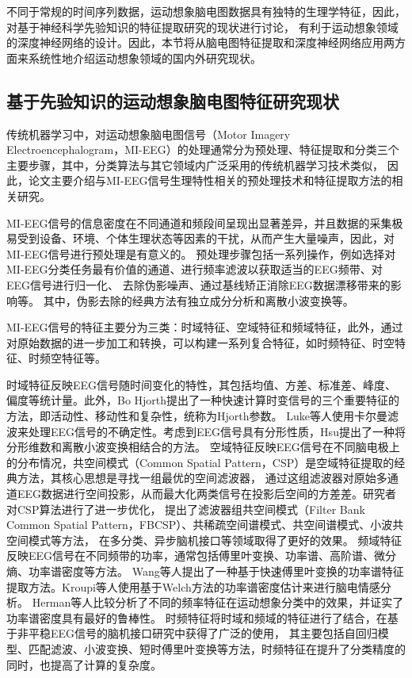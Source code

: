 不同于常规的时间序列数据，运动想象脑电图数据具有独特的生理学特征，因此，对基于神经科学先验知识的特征提取研究的现状进行讨论，
有利于运动想象领域的深度神经网络的设计。因此，本节将从脑电图特征提取和深度神经网络应用两方面来系统性地介绍运动想象领域的国内外研究现状。

\subsection{基于先验知识的运动想象脑电图特征研究现状}

传统机器学习中，对运动想象脑电图信号（Motor Imagery Electroencephalogram，MI-EEG）的处理通常分为预处理、特征提取和分类三个主要步骤\cite{altaheri2023deep}，其中，分类算法与其它领域内广泛采用的传统机器学习技术类似，
因此，论文主要介绍与MI-EEG信号生理特性相关的预处理技术和特征提取方法的相关研究。

MI-EEG信号的信息密度在不同通道和频段间呈现出显著差异，并且数据的采集极易受到设备、环境、个体生理状态等因素的干扰，从而产生大量噪声，因此，对MI-EEG信号进行预处理是有意义的。
预处理步骤包括一系列操作，例如选择对MI-EEG分类任务最有价值的通道、进行频率滤波以获取适当的EEG频带、对EEG信号进行归一化、
去除伪影噪声\cite{altaheri2023deep}、通过基线矫正消除EEG数据漂移带来的影响等。
其中，伪影去除的经典方法有独立成分分析和离散小波变换等\cite{sai2017automated}。

MI-EEG信号的特征主要分为三类：时域特征、空域特征和频域特征\cite{altaheri2023deep}，此外，通过对原始数据的进一步加工和转换，可以构建一系列复合特征，如时频特征、时空特征、时频空特征等。

时域特征反映EEG信号随时间变化的特性，其包括均值、方差、标准差、峰度、偏度等统计量。此外，Bo Hjorth\cite{HJORTH1970306}提出了一种快速计算时变信号的三个重要特征的方法，即活动性、移动性和复杂性，统称为Hjorth参数。
Luke等人\cite{7448410}使用卡尔曼滤波来处理EEG信号的不确定性。考虑到EEG信号具有分形性质，Hsu\cite{HSU2010295}提出了一种将分形维数和离散小波变换相结合的方法。
空域特征反映EEG信号在不同脑电极上的分布情况，共空间模式（Common Spatial Pattern，CSP）是空域特征提取的经典方法，其核心思想是寻找一组最优的空间滤波器，
通过这组滤波器对原始多通道EEG数据进行空间投影，从而最大化两类信号在投影后空间的方差差\cite{wang2006common}。研究者对CSP算法进行了进一步优化，
提出了滤波器组共空间模式（Filter Bank Common Spatial Pattern，FBCSP）\cite{ang2008filter}、共稀疏空间谱模式\cite{dornhege2006combined}、共空间谱模式\cite{lemm2005spatio}、小波共空间模式\cite{mousavi2011wavelet}等方法，
在多分类、异步脑机接口等领域取得了更好的效果。
频域特征反映EEG信号在不同频带的功率，通常包括傅里叶变换、功率谱、高阶谱、微分熵、功率谱密度等方法。
Wang等人\cite{wang2017tinnitus}提出了一种基于快速傅里叶变换的功率谱特征提取方法。Kroupi等人\cite{kroupi2011eeg}使用基于Welch方法的功率谱密度估计来进行脑电情感分析。
Herman等人\cite{herman2008comparative}比较分析了不同的频率特征在运动想象分类中的效果，并证实了功率谱密度具有最好的鲁棒性。
时频特征将时域和频域的特征进行了结合，在基于非平稳EEG信号的脑机接口研究中获得了广泛的使用\cite{pawar2020feature}，
其主要包括自回归模型、匹配滤波、小波变换、短时傅里叶变换等方法，时频特征在提升了分类精度的同时，也提高了计算的复杂度。

